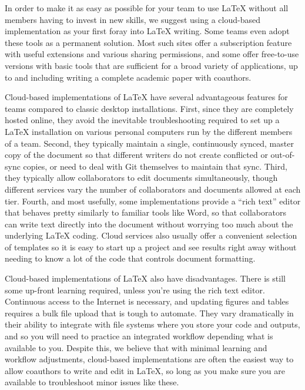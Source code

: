 In order to make it as easy as possible for your team
to use {\LaTeX} without all members having to invest in new skills,
we suggest using a cloud-based implementation as your first foray into {\LaTeX} writing.
Some teams even adopt these tools as a permanent solution.
Most such sites offer a subscription feature
with useful extensions and various sharing permissions,
and some offer free-to-use versions with basic tools that are sufficient
for a broad variety of applications,
up to and including writing a complete academic paper with coauthors.

Cloud-based implementations of {\LaTeX} have several advantageous features
for teams compared to classic desktop installations.
First, since they are completely hosted online,
they avoid the inevitable troubleshooting required to set up a {\LaTeX} installation
on various personal computers run by the different members of a team.
Second, they typically maintain a single, continuously synced, master copy of the document
so that different writers do not create conflicted or out-of-sync copies,
or need to deal with Git themselves to maintain that sync.
Third, they typically allow collaborators to edit documents simultaneously,
though different services vary the number of collaborators and documents allowed at each tier.
Fourth, and most usefully, some implementations provide a ``rich text'' editor
that behaves pretty similarly to familiar tools like Word,
so that collaborators can write text directly into the document without worrying too much
about the underlying {\LaTeX} coding.
Cloud services also usually offer a convenient selection of templates
so it is easy to start up a project and see results right away
without needing to know a lot of the code that controls document formatting.

Cloud-based implementations of {\LaTeX} also have disadvantages.
There is still some up-front learning required, unless you're using the rich text editor.
Continuous access to the Internet is necessary,
and updating figures and tables requires a bulk file upload that is tough to automate.
They vary dramatically in their ability to integrate
with file systems where you store your code and outputs,
and so you will need to practice an integrated workflow depending what is available to you.
Despite this, we believe that with minimal learning and workflow adjustments,
cloud-based implementations are often the easiest way to allow coauthors to write and edit in \LaTeX,
so long as you make sure you are available to troubleshoot minor issues like these.

